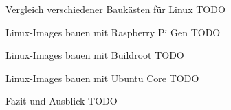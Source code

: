 \begin{frame}{Vergleich verschiedener Baukästen für Linux}
    TODO
\end{frame}

\begin{frame}{Linux-Images bauen mit Raspberry Pi Gen}
    TODO
\end{frame}

\begin{frame}{Linux-Images bauen mit Buildroot}
    TODO
\end{frame}

\begin{frame}{Linux-Images bauen mit Ubuntu Core}
    TODO
\end{frame}

\begin{frame}{Fazit und Ausblick}
    TODO
\end{frame}

